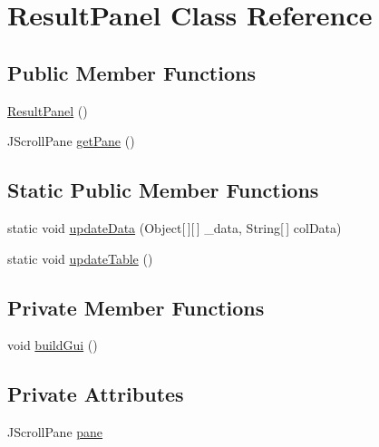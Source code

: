 \hypertarget{class_result_panel}{}\section{Result\+Panel Class Reference}
\label{class_result_panel}
\subsection*{Public Member Functions}
\begin{DoxyCompactItemize}
\item 
\hyperlink{class_result_panel_a1f0864074da52caf14581a14b2574d48}{Result\+Panel} ()
\item 
J\+Scroll\+Pane \hyperlink{class_result_panel_ace0f4c9bd2c1ddadc0e0484ac9da3d2b}{get\+Pane} ()
\end{DoxyCompactItemize}
\subsection*{Static Public Member Functions}
\begin{DoxyCompactItemize}
\item 
static void \hyperlink{class_result_panel_a46714631f37ba703978bdd94e6a666d3}{update\+Data} (Object\mbox{[}$\,$\mbox{]}\mbox{[}$\,$\mbox{]} \+\_\+data, String\mbox{[}$\,$\mbox{]} col\+Data)
\item 
static void \hyperlink{class_result_panel_a91bbedbe216c200121a25a629bdc6d2f}{update\+Table} ()
\end{DoxyCompactItemize}
\subsection*{Private Member Functions}
\begin{DoxyCompactItemize}
\item 
void \hyperlink{class_result_panel_a42092133d8e2f6819a8f1ee557b2fc1f}{build\+Gui} ()
\end{DoxyCompactItemize}
\subsection*{Private Attributes}
\begin{DoxyCompactItemize}
\item 
J\+Scroll\+Pane \hyperlink{class_result_panel_aa9b24b254e779baf6679dbbc6af4fe38}{pane}
\end{DoxyCompactItemize}
